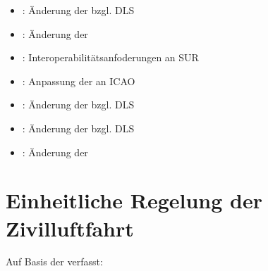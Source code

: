 \begin{itemize}
        \item {}:   Änderung der  bzgl. \acs{DLS} %
        \item {}:  Änderung der  %
        \item {}:   Interoperabilitätsanfoderungen an \acs{SUR} %
        \item {}:   Anpassung der  an {ICAO} %
        \item {}:  Änderung der  bzgl. \acs{DLS}%
        \item {}:   Änderung der  bzgl. \acs{DLS}%
        \item {}:   Änderung der  %
    \end{itemize}

\section{Einheitliche Regelung der Zivilluftfahrt} 
    Auf Basis der  verfasst:


